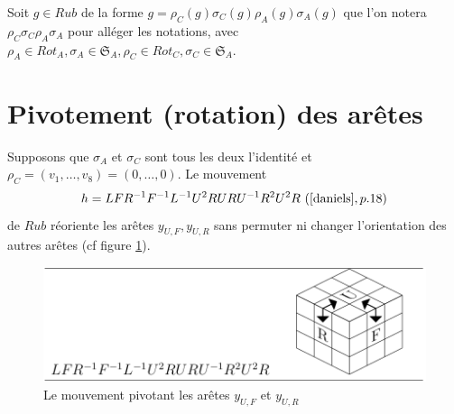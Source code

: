 \documentclass[french]{report}
\begin{document}


Soit $g \in Rub$ de la forme $g = \rho_C(g) \sigma_C(g) \rho_A(g) \sigma_A(g) $ que l'on notera $ \rho_C \sigma_C \rho_A \sigma_A$ pour alléger les notations, avec $\rho_A \in Rot_A, \sigma_A \in \mathfrak{S}_{A}, \rho_C \in Rot_{C}, \sigma_C \in \mathfrak{S}_{A}   $.

\section{Pivotement (rotation) des arêtes}


Supposons que $\sigma_A$ et $\sigma_C$ sont tous les deux l'identité et $ \rho_C = (v_1, \dots, v_8) = (0, \dots, 0)$. Le mouvement \begin{equation}
  h= LF R ^{-1}  F ^{-1}  L ^{-1}  U ^2 RU RU ^{-1}  R ^2 U ^2 R \ (\cite{daniels}, p. 18)
\end{equation} de $Rub$ réoriente les arêtes $y _{U,F}, y _{U,R}$ sans permuter ni changer l'orientation des autres arêtes (cf figure \ref{pivote_2_aretes}).

\begin{figure}[h!]
  \centering
  \includegraphics[scale=0.3]{figures/pivote_2_aretes.png}
  \caption{Le mouvement pivotant les arêtes $y _{U,F}$ et $y _{U,R}$}
  \label{pivote_2_aretes}
\end{figure}
\end{document}
